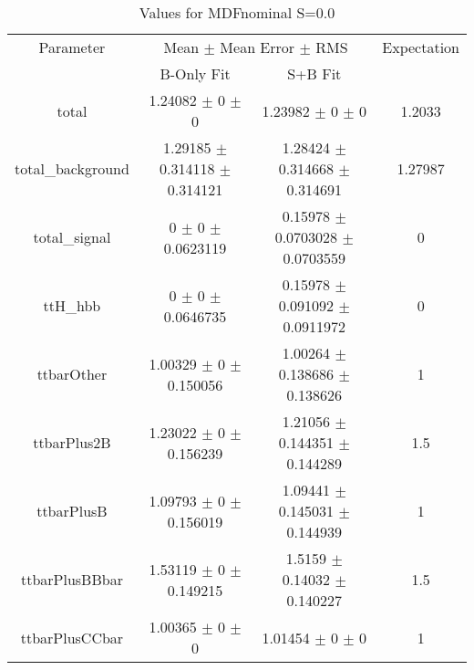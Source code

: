\begin{table}
\centering
\caption{Values for MDFnominal S=0.0}
\begin{tabular}{cccc}
\toprule
Parameter & \multicolumn{2}{c}{Mean $\pm$ Mean Error $\pm$ RMS} & Expectation\\
 & B-Only Fit & S+B Fit & \\
\midrule
total & \num{1.24082} $\pm$ \num{0} $\pm$ \num{0} & \num{1.23982} $\pm$ \num{0} $\pm$ \num{0} & \num{1.2033}\\
total\_background & \num{1.29185} $\pm$ \num{0.314118} $\pm$ \num{0.314121} & \num{1.28424} $\pm$ \num{0.314668} $\pm$ \num{0.314691} & \num{1.27987}\\
total\_signal & \num{0} $\pm$ \num{0} $\pm$ \num{0.0623119} & \num{0.15978} $\pm$ \num{0.0703028} $\pm$ \num{0.0703559} & \num{0}\\
ttH\_hbb & \num{0} $\pm$ \num{0} $\pm$ \num{0.0646735} & \num{0.15978} $\pm$ \num{0.091092} $\pm$ \num{0.0911972} & \num{0}\\
ttbarOther & \num{1.00329} $\pm$ \num{0} $\pm$ \num{0.150056} & \num{1.00264} $\pm$ \num{0.138686} $\pm$ \num{0.138626} & \num{1}\\
ttbarPlus2B & \num{1.23022} $\pm$ \num{0} $\pm$ \num{0.156239} & \num{1.21056} $\pm$ \num{0.144351} $\pm$ \num{0.144289} & \num{1.5}\\
ttbarPlusB & \num{1.09793} $\pm$ \num{0} $\pm$ \num{0.156019} & \num{1.09441} $\pm$ \num{0.145031} $\pm$ \num{0.144939} & \num{1}\\
ttbarPlusBBbar & \num{1.53119} $\pm$ \num{0} $\pm$ \num{0.149215} & \num{1.5159} $\pm$ \num{0.14032} $\pm$ \num{0.140227} & \num{1.5}\\
ttbarPlusCCbar & \num{1.00365} $\pm$ \num{0} $\pm$ \num{0} & \num{1.01454} $\pm$ \num{0} $\pm$ \num{0} & \num{1}\\
\bottomrule
\end{tabular}
\end{table}